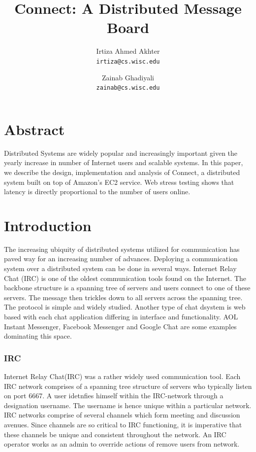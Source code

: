 \documentclass[12pt]{article}
\title{Connect: A Distributed Message Board}
\author{Irtiza Ahmed Akhter\\
\texttt{irtiza@cs.wisc.edu} \and Zainab Ghadiyali\\ \texttt{zainab@cs.wisc.edu}}
\begin{document}
\maketitle



\section{Abstract}
Distributed Systems are widely popular and increasingly important given the yearly increase in number of Internet users and scalable systems. In this paper, we describe the design, implementation and analysis of Connect, a distributed system built on top of Amazon's EC2 service. Web stress testing shows that latency is directly proportional to the number of users online. 
 
\section{Introduction}
\label{Introduction}

The increasing ubiquity of distributed systems utilized for communication has paved way for an increasing number of advances. Deploying a communication system over a distributed system can be done in several ways. Internet Relay Chat (IRC) is one of the oldest communication tools found on the Internet. The backbone structure is a spanning tree of servers and users connect to one of these servers. The message then trickles down to all servers across the spanning tree. The protocol is simple and widely studied. Another type of chat dsystem is web based with each chat application differing in interface and functionality. AOL Instant Messenger, Facebook Messenger and Google Chat are some examples dominating this space.
 
\subsubsection{IRC}
Internet Relay Chat(IRC\cite{IRC}) was a rather widely used communication tool. Each IRC network comprises of a spanning tree structure of servers who typically listen on port 6667. A user idetnfies himself within the IRC-network through a designation username. The username is hence unique within a particular network. 
IRC networks comprise of several channels which form meeting and discussion avenues. Since channels are so critical to IRC functioning, it is imperative that these channels be unique and consistent throughout the network. An IRC operator works as an admin to override actions of remove users from network. 
\end{document}
